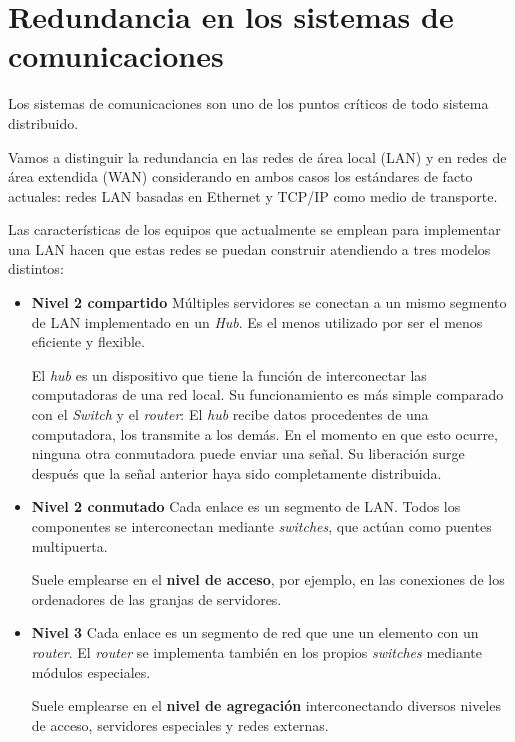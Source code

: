 \section{Redundancia en los sistemas de comunicaciones}
Los sistemas de comunicaciones son uno de los puntos críticos de todo sistema distribuido.

Vamos a distinguir la redundancia en las redes de área local (LAN) y en redes de área extendida (WAN) considerando en ambos casos los estándares de facto actuales: redes LAN basadas en Ethernet y TCP/IP como medio de transporte.

Las características de los equipos que actualmente se emplean para implementar una LAN hacen que estas redes se puedan construir atendiendo a tres modelos distintos:
\begin{itemize}
\item \textbf{Nivel 2 compartido} Múltiples servidores se conectan a un mismo segmento de LAN implementado en un \textit{Hub}. Es el menos utilizado por ser el menos eficiente y flexible.

El \textit{hub} es un dispositivo que tiene la función de interconectar las computadoras de una red local. Su funcionamiento es más simple comparado con el \textit{Switch} y el \textit{router}:
El \textit{hub} recibe datos procedentes de una computadora, los transmite a los demás. En el momento en que esto ocurre, ninguna otra conmutadora puede enviar una señal. Su liberación surge después que la señal anterior haya sido completamente distribuida.


\item \textbf{Nivel 2 conmutado} Cada enlace es un segmento de LAN. Todos los componentes se interconectan mediante \textit{switches}, que actúan como puentes multipuerta.

Suele emplearse en el \textbf{nivel de acceso}, por ejemplo, en las conexiones de los ordenadores de las granjas de servidores.

\item \textbf{Nivel 3} Cada enlace es un segmento de red que une un elemento con un \textit{router}. El \textit{router} se implementa también en los propios \textit{switches} mediante módulos especiales.

Suele emplearse en el \textbf{nivel de agregación} interconectando diversos niveles de acceso, servidores especiales y redes externas.
\end{itemize}

